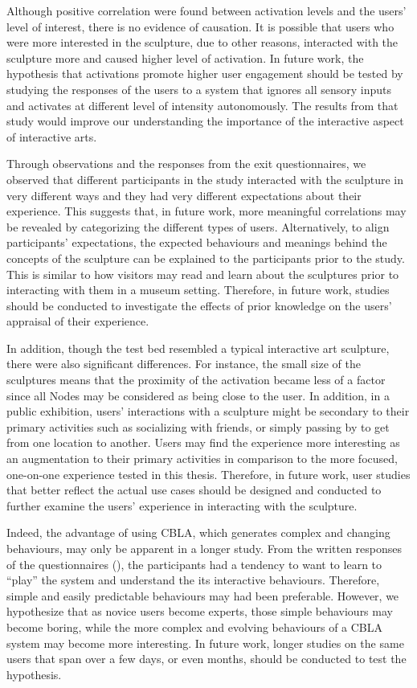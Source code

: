 Although positive correlation were found between activation levels and the users' level of interest, there is no evidence of causation. It is possible that users who were more interested in the sculpture, due to other reasons, interacted with the sculpture more and caused higher level of activation. In future work, the hypothesis that activations promote higher user engagement should be tested by studying the responses of the users to a system that ignores all sensory inputs and activates at different level of intensity autonomously. The results from that study would improve our understanding the importance of the interactive aspect of interactive arts.

Through observations and the responses from the exit questionnaires, we observed that different participants in the study interacted with the sculpture in very different ways and they had very different expectations about their experience. This suggests that, in future work, more meaningful correlations may be revealed by categorizing the different types of users. Alternatively, to align participants' expectations, the expected behaviours and meanings behind the concepts of the sculpture can be explained to the participants prior to the study. This is similar to how visitors may read and learn about the sculptures prior to interacting with them in a museum setting. Therefore, in future work, studies should be conducted to investigate the effects of prior knowledge on the users' appraisal of their experience. 

In addition, though the test bed resembled a typical interactive art sculpture, there were also significant differences. For instance, the small size of the sculptures means that the proximity of the activation became less of a factor since all Nodes may be considered as being close to the user. In addition, in a public exhibition, users' interactions with a sculpture might be secondary to their primary activities such as socializing with friends, or simply passing by to get from one location to another. Users may find the experience more interesting as an augmentation to their primary activities in comparison to the more focused, one-on-one experience tested in this thesis. Therefore, in future work, user studies that better reflect the actual use cases should be designed and conducted to further examine the users' experience in interacting with the sculpture. 

Indeed, the advantage of using CBLA, which generates complex and changing behaviours, may only be apparent in a longer study. From the written responses of the questionnaires (), the participants had a tendency to want to learn to ``play'' the system and understand the its interactive behaviours. Therefore, simple and easily predictable behaviours may had been preferable. However, we hypothesize that as novice users become experts, those simple behaviours may become boring, while the more complex and evolving behaviours of a CBLA system may become more interesting. In future work, longer studies on the same users that span over a few days, or even months, should be conducted to test the hypothesis.

